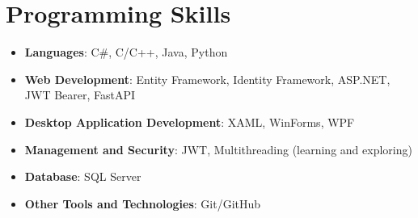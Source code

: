 \documentclass[letterpaper,11pt]{article}
\newcommand{\resumeItem}[2]{
  \item\small{
    \textbf{#1}{: #2 \vspace{-2pt}}
  }
}
\newcommand{\resumeSubHeadingListStart}{\begin{itemize}[leftmargin=*]}
\newcommand{\resumeSubHeadingListEnd}{\end{itemize}}
\begin{document}
\section{Programming Skills}
\resumeSubHeadingListStart
  \resumeItem{Languages}{C\#, C/C++, Java, Python}
  \resumeItem{Web Development}{Entity Framework, Identity Framework, ASP.NET, JWT Bearer, FastAPI}
  \resumeItem{Desktop Application Development}{XAML, WinForms, WPF}
  \resumeItem{Management and Security}{JWT, Multithreading (learning and exploring)}
  \resumeItem{Database}{SQL Server}
  \resumeItem{Other Tools and Technologies}{Git/GitHub}
\resumeSubHeadingListEnd

\end{document}
